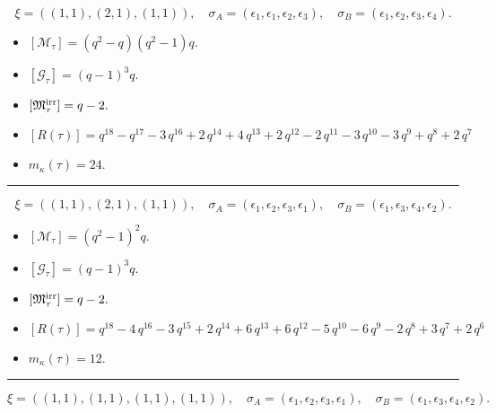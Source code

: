 \documentclass[10pt,a4paper]{amsart}
\begin{document}
$$\xi = ({(1, 1)}, {(2, 1)}, {(1, 1)}),\quad \sigma_A = ({{\epsilon_1}}, {{\epsilon_1, \epsilon_2}}, {{\epsilon_3}}),\quad \sigma_B = ({{\epsilon_1}}, {{\epsilon_2, \epsilon_3}}, {{\epsilon_4}}).$$

\begin{itemize}
 \item $[\mathcal{M}_{\tau}] = {\left(q^{2} - q\right)} {\left(q^{2} - 1\right)} q .$

 \item $[\mathcal{G}_{\tau}] = {\left(q - 1\right)}^{3} q .$

 \item $[{\frak M}_{\tau}^{\textrm{irr}}] = q - 2 .$

 \item $[R(\tau)] = q^{18} - q^{17} - 3 \, q^{16} + 2 \, q^{14} + 4 \, q^{13} + 2 \, q^{12} - 2 \, q^{11} - 3 \, q^{10} - 3 \, q^{9} + q^{8} + 2 \, q^{7} $

 \item $m_{\kappa}(\tau) = 24 .$

 \end{itemize}
\noindent\rule{8cm}{0.4pt}

$$\xi = ({(1, 1)}, {(2, 1)}, {(1, 1)}),\quad \sigma_A = ({{\epsilon_1}}, {{\epsilon_2, \epsilon_3}}, {{\epsilon_1}}),\quad \sigma_B = ({{\epsilon_1}}, {{\epsilon_3, \epsilon_4}}, {{\epsilon_2}}).$$

\begin{itemize}
 \item $[\mathcal{M}_{\tau}] = {\left(q^{2} - 1\right)}^{2} q .$

 \item $[\mathcal{G}_{\tau}] = {\left(q - 1\right)}^{3} q .$

 \item $[{\frak M}_{\tau}^{\textrm{irr}}] = q - 2 .$

 \item $[R(\tau)] = q^{18} - 4 \, q^{16} - 3 \, q^{15} + 2 \, q^{14} + 6 \, q^{13} + 6 \, q^{12} - 5 \, q^{10} - 6 \, q^{9} - 2 \, q^{8} + 3 \, q^{7} + 2 \, q^{6} $

 \item $m_{\kappa}(\tau) = 12 .$

 \end{itemize}
\noindent\rule{8cm}{0.4pt}

$$\xi = ({(1, 1)}, {(1, 1), (1, 1)}, {(1, 1)}),\quad \sigma_A = ({{\epsilon_1}}, {{\epsilon_2}, {\epsilon_3}}, {{\epsilon_1}}),\quad \sigma_B = ({{\epsilon_1}}, {{\epsilon_3}, {\epsilon_4}}, {{\epsilon_2}}).$$
\end{document}
